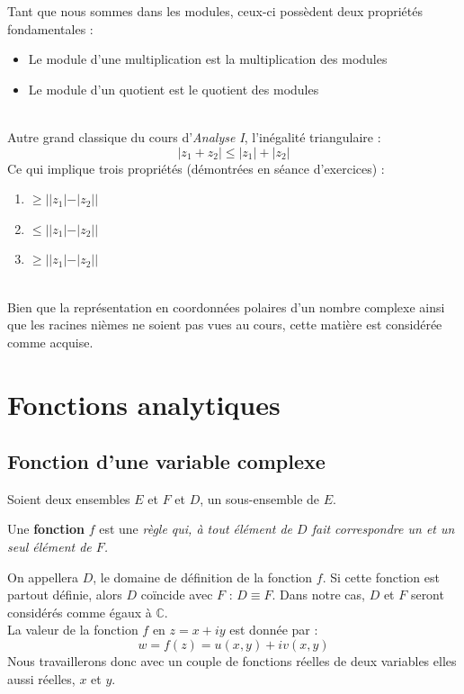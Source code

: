         Tant que nous sommes dans les modules, ceux-ci possèdent deux propriétés 
        fondamentales :
        \begin{itemize}
        \item Le module d'une multiplication est la multiplication des modules
        \item Le module d'un quotient est le quotient des modules
        \end{itemize}\ \\
        
        Autre grand classique du cours d'\textit{Analyse I}, l'inégalité triangulaire :
        \begin{equation}
            |z_1 + z_2| \leq |z_1|+|z_2|
        \end{equation}
        Ce qui implique trois propriétés (démontrées en séance d'exercices) :
        \begin{enumerate}
        \item {} $\geq ||z_1| - |z_2||$
        \item {} $\leq ||z_1| - |z_2||$
        \item {} $\geq ||z_1| - |z_2||$
        \end{enumerate}\ \\
        
        Bien que la représentation en coordonnées polaires d'un nombre complexe ainsi que
        les racines nièmes ne soient pas vues au cours, cette matière est considérée comme
        acquise.

        
\section{Fonctions analytiques}
    \subsection{Fonction d'une variable complexe}
    Soient deux ensembles $E$ et $F$ et $D$, un sous-ensemble de $E$. 
    \begin{center}
    Une \textbf{fonction}
    $f$ est une \textit{règle qui, à tout élément de $D$ fait correspondre un et un seul
    élément de $F$.}
    \end{center}
    On appellera $D$, le domaine de définition de la fonction $f$. Si cette fonction est 
    partout définie, alors $D$ coïncide avec $F$ : $D \equiv F$. Dans notre cas, $D$ et $F$
    seront considérés comme égaux à $\mathbb{C}$.\\
    La valeur de la fonction $f$ en $z = x+iy$ est donnée par :
    \begin{equation}
        w = f(z) = u(x,y) + iv(x,y)
    \end{equation}
    Nous travaillerons donc avec un couple de  fonctions réelles de deux variables elles 
    aussi réelles, $x$ et $y$.
    
